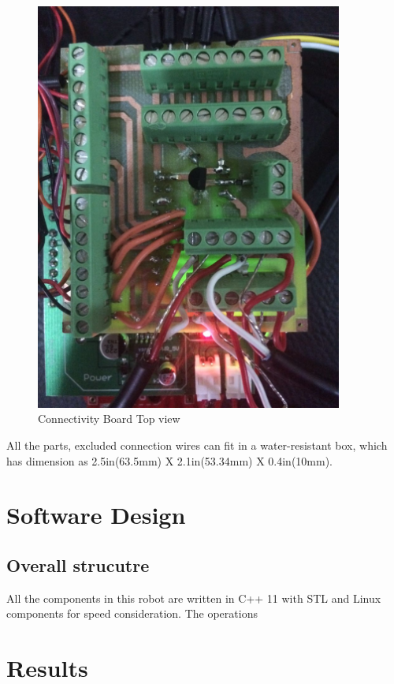     \begin{figure}[H]
    \centering
    \includegraphics[width=0.9\textwidth]{con_board_top.jpg}
    \caption{\label{fig:Con Board}Connectivity Board Top view}
    \end{figure}
    All the parts, excluded connection wires can fit in a water-resistant box, which has dimension as 2.5in(63.5mm) X 2.1in(53.34mm) X 0.4in(10mm).

  
         

\newpage
\section{Software Design}


    \subsection{Overall strucutre}
    All the components in this robot are written in C++ 11 with STL and Linux components for speed consideration. The operations 
\section{Results}
